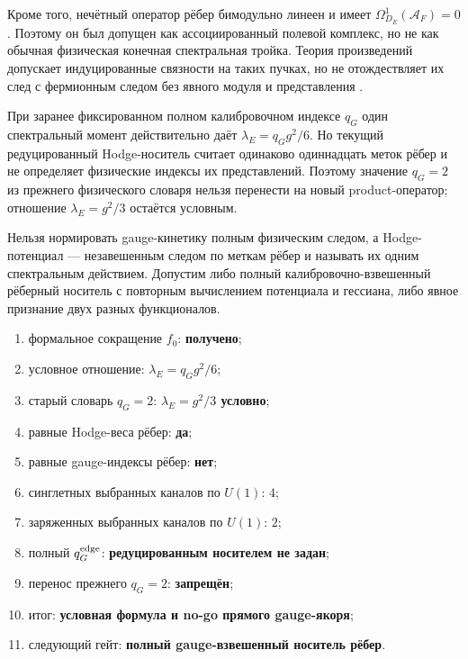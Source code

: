 Кроме того, нечётный оператор рёбер бимодульно линеен и имеет
$\Omega^1_{D_E}(\mathcal A_F)=0$. Поэтому он был допущен как
ассоциированный полевой комплекс, но не как обычная физическая конечная
спектральная тройка. Теория произведений допускает индуцированные связности
на таких пучках, но не отождествляет их след с фермионным следом без явного
модуля и представления \cite{v7-gauge-anchor-product}.

\begin{theorem}
При заранее фиксированном полном калибровочном индексе $q_G$ один
спектральный момент действительно даёт
$\lambda_E=q_Gg^2/6$. Но текущий редуцированный Hodge-носитель считает
одинаково одиннадцать меток рёбер и не определяет физические индексы их
представлений. Поэтому значение $q_G=2$ из прежнего физического словаря
нельзя перенести на новый product-оператор; отношение
$\lambda_E=g^2/3$ остаётся условным.
\end{theorem}

\begin{nogocriterion}
Нельзя нормировать gauge-кинетику полным физическим следом, а Hodge-потенциал
--- незавешенным следом по меткам рёбер и называть их одним спектральным
действием. Допустим либо полный калибровочно-взвешенный рёберный носитель с
повторным вычислением потенциала и гессиана, либо явное признание двух
разных функционалов.
\end{nogocriterion}

\begin{protocol}
\begin{enumerate}
 \item формальное сокращение $f_0$: \textbf{получено};
 \item условное отношение: \textbf{$\lambda_E=q_Gg^2/6$};
 \item старый словарь $q_G=2$: \textbf{$\lambda_E=g^2/3$ условно};
 \item равные Hodge-веса рёбер: \textbf{да};
 \item равные gauge-индексы рёбер: \textbf{нет};
 \item синглетных выбранных каналов по $U(1)$: \textbf{$4$};
 \item заряженных выбранных каналов по $U(1)$: \textbf{$2$};
 \item полный $q_G^{\rm edge}$: \textbf{редуцированным носителем не задан};
 \item перенос прежнего $q_G=2$: \textbf{запрещён};
 \item итог: \textbf{условная формула и no-go прямого gauge-якоря};
 \item следующий гейт: \textbf{полный gauge-взвешенный носитель рёбер}.
\end{enumerate}
\end{protocol}

